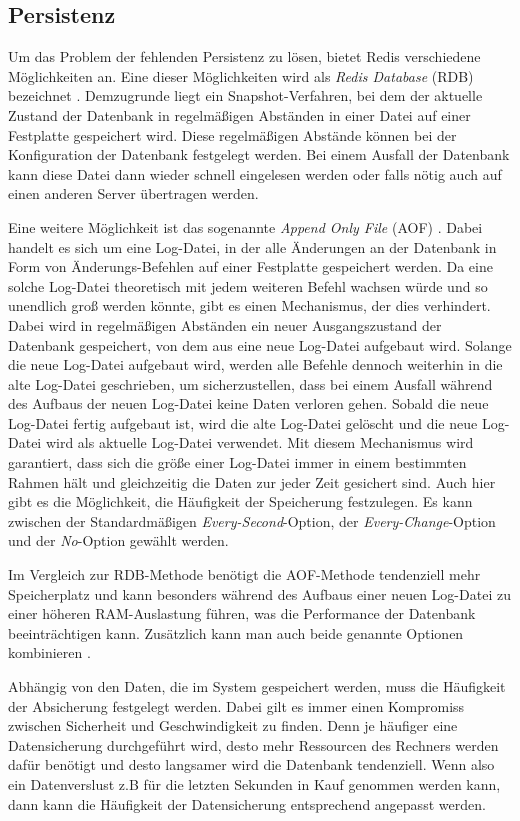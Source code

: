 
\subsection{Persistenz}
\label{sec:Persistenz}
Um das Problem der fehlenden Persistenz zu lösen, bietet Redis verschiedene Möglichkeiten an.
Eine dieser Möglichkeiten wird als \textit{Redis Database} (RDB) bezeichnet \cite{Redis-Docs-Persistenz}. 
Demzugrunde liegt ein Snapshot-Verfahren, bei dem der aktuelle Zustand der Datenbank in regelmäßigen Abständen in einer Datei auf einer Festplatte gespeichert wird.
Diese regelmäßigen Abstände können bei der Konfiguration der Datenbank festgelegt werden. 
Bei einem Ausfall der Datenbank kann diese Datei dann wieder schnell eingelesen werden oder falls nötig auch auf einen anderen Server übertragen werden.

Eine weitere Möglichkeit ist das sogenannte \textit{Append Only File} (AOF) \cite{Redis-Docs-Persistenz}. 
Dabei handelt es sich um eine Log-Datei, in der alle Änderungen an der Datenbank in Form von Änderungs-Befehlen auf einer Festplatte gespeichert werden.
Da eine solche Log-Datei theoretisch mit jedem weiteren Befehl wachsen würde und so unendlich groß werden könnte, gibt es einen Mechanismus, der dies verhindert.
Dabei wird in regelmäßigen Abständen ein neuer Ausgangszustand der Datenbank gespeichert, von dem aus eine neue Log-Datei aufgebaut wird. 
Solange die neue Log-Datei aufgebaut wird, werden alle Befehle dennoch weiterhin in die alte Log-Datei geschrieben, um sicherzustellen, dass bei einem Ausfall während des Aufbaus der neuen Log-Datei keine Daten verloren gehen.
Sobald die neue Log-Datei fertig aufgebaut ist, wird die alte Log-Datei gelöscht und die neue Log-Datei wird als aktuelle Log-Datei verwendet.
Mit diesem Mechanismus wird garantiert, dass sich die größe einer Log-Datei immer in einem bestimmten Rahmen hält und gleichzeitig die Daten zur jeder Zeit gesichert sind.
Auch hier gibt es die Möglichkeit, die Häufigkeit der Speicherung festzulegen. Es kann zwischen der Standardmäßigen \textit{Every-Second}-Option, der \textit{Every-Change}-Option und der \textit{No}-Option gewählt werden.

Im Vergleich zur RDB-Methode benötigt die AOF-Methode tendenziell mehr Speicherplatz und kann besonders während des Aufbaus einer neuen Log-Datei zu einer höheren RAM-Auslastung führen, was die Performance der Datenbank beeinträchtigen kann.
Zusätzlich kann man auch beide genannte Optionen kombinieren \cite{Redis-Docs-Persistenz}.

Abhängig von den Daten, die im System gespeichert werden, muss die Häufigkeit der Absicherung festgelegt werden.
Dabei gilt es immer einen Kompromiss zwischen Sicherheit und Geschwindigkeit zu finden.
Denn je häufiger eine Datensicherung durchgeführt wird, desto mehr Ressourcen des Rechners werden dafür benötigt und desto langsamer wird die Datenbank tendenziell.
Wenn also ein Datenverslust z.B für die letzten Sekunden in Kauf genommen werden kann, dann kann die Häufigkeit der Datensicherung entsprechend angepasst werden.


